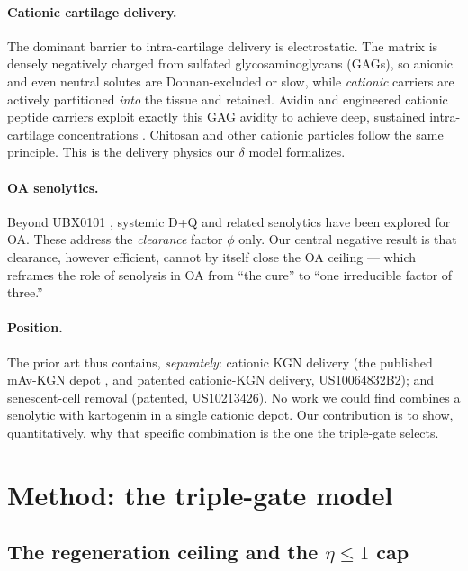 \documentclass[11pt,a4paper]{article}
\begin{document}
\paragraph{Cationic cartilage delivery.}
The dominant barrier to intra-cartilage delivery is electrostatic. The matrix is
densely negatively charged from sulfated glycosaminoglycans (GAGs), so anionic and
even neutral solutes are Donnan-excluded or slow, while \emph{cationic} carriers
are actively partitioned \emph{into} the tissue and retained. Avidin and
engineered cationic peptide carriers exploit exactly this GAG avidity to achieve
deep, sustained intra-cartilage concentrations \citep{bajpayee2014,bajpayee2017}.
Chitosan and other cationic particles follow the same principle. This is the
delivery physics our $\delta$ model formalizes.

\paragraph{OA senolytics.}
Beyond UBX0101 \citep{jeon2017}, systemic D+Q \citep{zhu2015} and related
senolytics have been explored for OA. These address the \emph{clearance} factor
$\phi$ only. Our central negative result is that clearance, however efficient,
cannot by itself close the OA ceiling --- which reframes the role of senolysis in
OA from ``the cure'' to ``one irreducible factor of three.''

\paragraph{Position.}
The prior art thus contains, \emph{separately}: cationic KGN delivery (the
published mAv-KGN depot \citep{he2022}, and patented cationic-KGN delivery,
US10064832B2); and senescent-cell removal (patented, US10213426). No work we could
find combines a senolytic with kartogenin in a single cationic depot. Our
contribution is to show, quantitatively, why that specific combination is the one
the triple-gate selects.

\section{Method: the triple-gate model}
\label{sec:method}

\subsection{The regeneration ceiling and the $\eta\le1$ cap}
\end{document}

